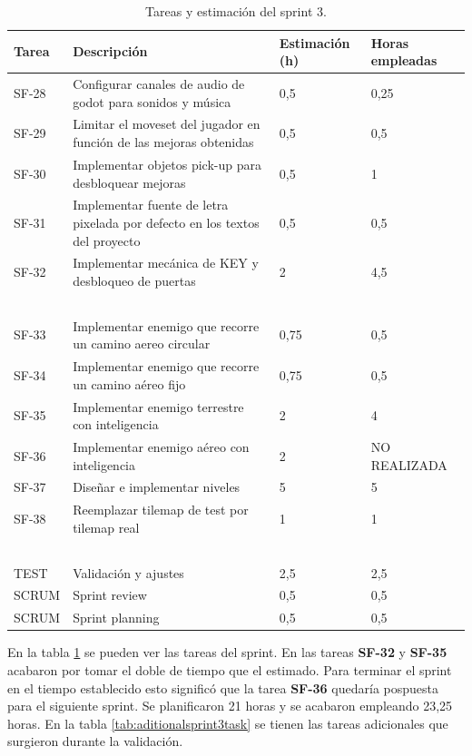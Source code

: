 \begin{table}[!ht]
    \centering
    \begin{tabular}{|l|p{8cm}|p{2cm}|p{2cm}|}
    \hline
        Tarea & Descripción & Estimación (h) & Horas empleadas \\ \hline
        SF-28 & Configurar canales de audio de godot para sonidos y música & 0,5 & 0,25 \\ \hline
        SF-29 & Limitar el moveset del jugador en función de las mejoras obtenidas & 0,5 & 0,5 \\ \hline
        SF-30 & Implementar objetos pick-up para desbloquear mejoras & 0,5 & 1 \\ \hline
        SF-31 & Implementar fuente de letra pixelada por defecto en los textos del proyecto & 0,5 & 0,5 \\ \hline
        SF-32 & Implementar mecánica de KEY y desbloqueo de puertas & 2 & 4,5 \\ \hline
        ~ & ~ & ~ & ~ \\ \hline
        SF-33 & Implementar enemigo que recorre un camino aereo circular & 0,75 & 0,5 \\ \hline
        SF-34 & Implementar enemigo que recorre un camino aéreo fijo & 0,75 & 0,5 \\ \hline
        SF-35 & Implementar enemigo terrestre con inteligencia & 2 & 4 \\ \hline
        SF-36 & Implementar enemigo aéreo con inteligencia & 2 & NO REALIZADA \\ \hline
        SF-37 & Diseñar e implementar niveles & 5 & 5 \\ \hline
        SF-38 & Reemplazar tilemap de test por tilemap real & 1 & 1 \\ \hline
        ~ & ~ & ~ & ~ \\ \hline
        TEST & Validación y ajustes & 2,5 & 2,5 \\ \hline
        SCRUM & Sprint review & 0,5 & 0,5 \\ \hline
        SCRUM & Sprint planning & 0,5 & 0,5 \\ \hline
    \end{tabular}
    \caption{Tareas y estimación del sprint 3.}
    \label{tab:sprint3task}
\end{table}

En la tabla \ref{tab:sprint3task} se pueden ver las tareas del sprint. En las tareas \textbf{SF-32} y \textbf{SF-35} acabaron por tomar el doble de tiempo que el estimado. Para terminar el sprint en el tiempo establecido esto significó que la tarea \textbf{SF-36} quedaría pospuesta para el siguiente sprint. Se planificaron 21 horas y se acabaron empleando 23,25 horas. En la tabla \ref{tab:aditionalsprint3task} se tienen las tareas adicionales que surgieron durante la validación.


